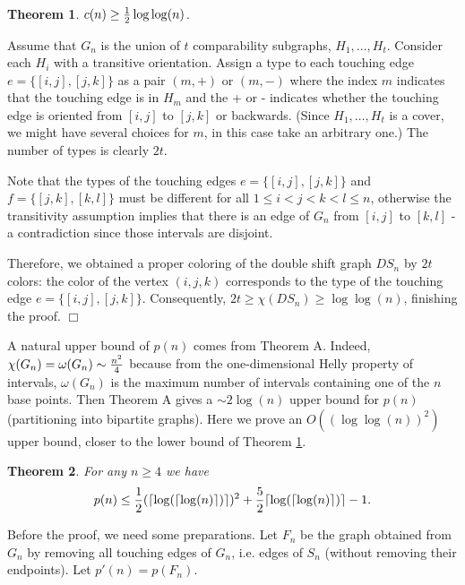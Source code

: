 \documentclass[12pt]{article}
\newtheorem{theorem}{Theorem}%
\def\qed{\ifhmode\unskip\nobreak\fi\quad\ifmmode\Box\else$\Box$\fi}
\def\qed{\hfill $\Box$}
\begin{document}
\begin{theorem}\label{loglog} $c(n)\ge  {1\over 2}\log\log(n)$.
\end{theorem}



\medskip
{}  Assume that $G_n$ is the union of $t$ comparability subgraphs,
$H_1,\dots,H_t$. Consider each $H_i$ with a transitive orientation.
     Assign a type to each touching edge $e=\{[i,j],[j,k]\}$
    as a pair $(m,+)$ or $(m,-)$ where the index $m$ indicates that the touching edge is
    in $H_m$ and the + or - indicates whether the touching edge is oriented from $[i,j]$
    to $[j,k]$ or backwards.
    (Since $H_1,\dots,H_t$ is a cover, we might have several choices for $m$, in this case
    take an arbitrary one.) The number of types is clearly $2t$.

    Note that the types of the touching edges $e=\{[i,j],[j,k]\}$ and $f=\{[j,k],[k,l]\}$ must be different
    for all $1\le i<j<k<l\le n$, otherwise the transitivity assumption implies that there is an edge of $G_n$
    from $[i,j]$ to $[k,l]$ - a contradiction since those intervals are disjoint.

    Therefore, we obtained a proper coloring of the double shift graph $DS_n$ by $2t$ colors:
    the color of the vertex $(i, j, k)$ corresponds to the type of
    the touching edge $e=\{[i,j],[j,k]\}$. Consequently, $2t\ge \chi(DS_n)\ge \log\log(n)$, finishing the proof.  \qed

\medskip


A natural upper bound of $p(n)$ comes from Theorem A.
Indeed, $\chi(G_n)=\omega(G_n)\sim {n^2\over 4}$ because
from the one-dimensional Helly property of intervals,
$\omega(G_n)$ is the
maximum number of intervals containing one of the $n$ base points.
Then Theorem A gives a $\sim 2\log(n)$ upper bound for $p(n)$
(partitioning into bipartite graphs).
Here we prove an $O((\log\log(n))^2)$  upper bound, closer to the lower bound of Theorem \ref{loglog}.


\begin{theorem}\label{ub} For any $n\ge 4$ we have
  $$p(n)\le {1\over 2}(\lceil\log(\lceil\log(n)\rceil)\rceil)^2+{5\over 2}\lceil\log(\lceil\log(n)\rceil)\rceil-1.$$
\end{theorem}




Before the proof, we need some preparations.
Let $F_n$ be the graph obtained from $G_n$ by removing all touching edges of $G_n$,
i.e. edges of $S_n$ (without removing their endpoints).
Let
$p'(n)=p(F_n)$.
\end{document}
